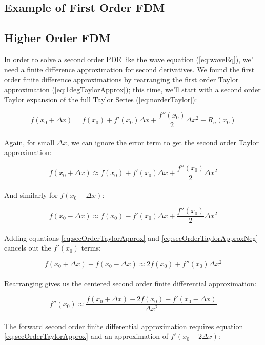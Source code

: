 {\subsection{Example of First Order FDM}



\subsection{Higher Order FDM}

In order to solve a second order PDE like the wave equation (\ref{eq:waveEq}), we'll need a finite difference approximation for second derivatives.  We found the first order finite difference approximations by rearranging the first order Taylor approximation (\ref{eq:1degTaylorApprox}); this time, we'll start with a second order Taylor expansion of the full Taylor Series (\ref{eq:norderTaylor}):

 \begin{equation}
  f(x_{0} + \Delta  x) = f(x_{0}) + f'(x_{0})\Delta  x + \frac{f''(x_{0})}{2}\Delta  x^{2} + R_{n}(x_{0})
  \end{equation}
    \\
  Again, for small $\Delta  x$, we can ignore the error term to get the second order Taylor approximation:
  
   \begin{equation}\label{eq:secOrderTaylorApprox}
  f(x_{0} + \Delta  x) \approx f(x_{0}) + f'(x_{0})\Delta  x + \frac{f''(x_{0})}{2}\Delta  x^{2}
  \end{equation}
    \\
  And similarly for  $f(x_{0} - \Delta  x)$:
  
     \begin{equation}\label{eq:secOrderTaylorApproxNeg}
  f(x_{0} - \Delta  x) \approx f(x_{0}) - f'(x_{0})\Delta  x + \frac{f''(x_{0})}{2}\Delta  x^{2}
  \end{equation}
    \\
  Adding equations \ref{eq:secOrderTaylorApprox} and \ref{eq:secOrderTaylorApproxNeg} cancels out the $f'(x_{0})$ terms:
  
   \begin{equation}
  f(x_{0} + \Delta  x) + f(x_{0} - \Delta  x) \approx 2f(x_{0}) + f''(x_{0})\Delta  x^{2}
  \end{equation}
    \\
  Rearranging gives us the centered second order finite differential approximation:
  
   \begin{equation}
   f''(x_{0}) \approx \frac{f(x_{0} + \Delta  x) - 2f(x_{0}) + f'(x_{0} -\Delta  x)}{\Delta  x^{2}}
  \end{equation}
    \\
  The forward second order finite differential approximation requires equation \ref{eq:secOrderTaylorApprox} and an approximation of $f'(x_{0} + 2\Delta  x)$:
  
}
